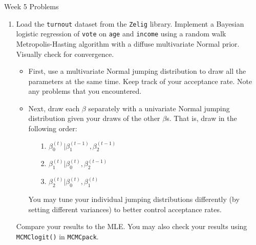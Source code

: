 \documentclass[10pt,a4paper]{article}
\author{Patrick Lam}
\begin{document}
\begin{center}
\begin{Large}Week 5 Problems\end{Large}
\end{center}
\bigskip
\begin{enumerate}

\item Load the {\tt turnout} dataset from the {\tt Zelig} library.  Implement a Bayesian logistic regression of {\tt vote} on {\tt age} and {\tt income} using a random walk Metropolis-Hasting algorithm with a diffuse multivariate Normal prior.  Visually check for convergence.

\begin{itemize}
\item First, use a multivariate Normal jumping distribution to draw all the parameters at the same time.  Keep track of your acceptance rate.  Note any problems that you encountered.
\item Next, draw each $\beta$ separately with a univariate Normal jumping distribution given your draws of the other $\beta$s.  That is, draw in the following order:
\begin{enumerate}
\item[1.] $\beta_0^{(t)} | \beta_1^{(t-1)}, \beta_2^{(t-1)}$
\item[2.] $\beta_1^{(t)} | \beta_0^{(t)}, \beta_2^{(t-1)}$
\item[3.] $\beta_2^{(t)} | \beta_0^{(t)}, \beta_1^{(t)}$
\end{enumerate}
You may tune your individual jumping distributions differently (by setting different variances) to better control acceptance rates.
\end{itemize}

Compare your results to the MLE.  You may also check your results using {\tt MCMClogit()} in {\tt MCMCpack}.    
\end{enumerate}
\end{document}
